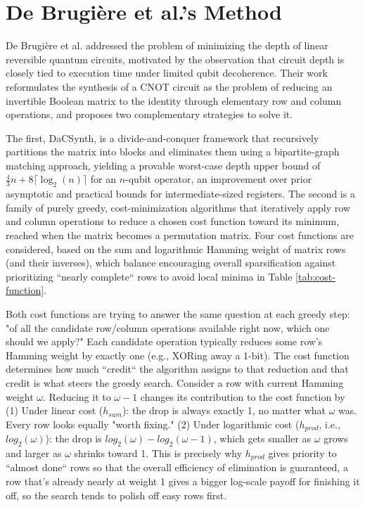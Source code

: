 \section{De Brugière et al.'s Method}
De Brugière et al. \cite{9475957} addressed the problem of minimizing the depth of linear reversible quantum circuits, motivated by the observation that circuit depth is closely tied to execution time under limited qubit decoherence. Their work reformulates the synthesis of a CNOT circuit as the problem of reducing an invertible Boolean matrix to the identity through elementary row and column operations, and proposes two complementary strategies to solve it.

The first, DaCSynth, is a divide-and-conquer framework that recursively partitions the matrix into blocks and eliminates them using a bipartite-graph matching approach, yielding a provable worst-case depth upper bound of $\frac{4}{3}n + 8\lceil \log_2(n) \rceil$ for an $n$-qubit operator, an improvement over prior asymptotic and practical bounds for intermediate-sized registers. The second is a family of purely greedy, cost-minimization algorithms that iteratively apply row and column operations to reduce a chosen cost function toward its minimum, reached when the matrix becomes a permutation matrix. Four cost functions are considered, based on the sum and logarithmic Hamming weight of matrix rows (and their inverses), which balance encouraging overall sparsification against prioritizing ``nearly complete`` rows to avoid local minima in Table \ref{tab:cost-function}.

Both cost functions are trying to answer the same question at each greedy step: "of all the candidate row/column operations available right now, which one should we apply?" Each candidate operation typically reduces some row's Hamming weight by exactly one (e.g., XORing away a 1-bit). The cost function determines how much ``credit`` the algorithm assigns to that reduction and that credit is what steers the greedy search. Consider a row with current Hamming weight $\omega$. Reducing it to $\omega−1$ changes its contribution to the cost function by (1) Under linear cost ($h_{sum}$): the drop is always exactly 1, 
no matter what $\omega$ was. Every row looks equally "worth fixing." (2) Under logarithmic cost ($h_{prod}$, i.e., $log_{2}(\omega)$): the drop is $log_{2}(\omega)-log_{2}(\omega - 1)$, which gets smaller as $\omega$ grows and larger as $\omega$
 shrinks toward 1. This is precisely why $h_{prod}$  gives priority to ``almost done`` rows so that the overall efficiency of elimination is guaranteed, a row that's already nearly at weight 1 gives a bigger log-scale payoff for finishing it off, so the search tends to polish off easy rows first.

